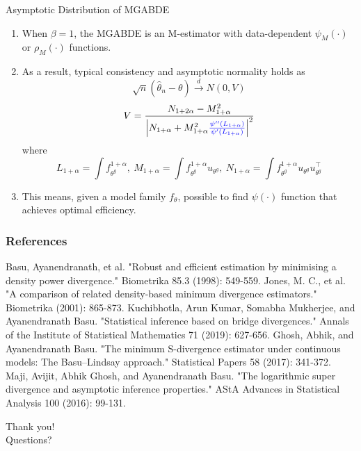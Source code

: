 \documentclass[10pt]{beamer}
\newcommand{\tr}{^{\intercal}}
\begin{document}
\begin{frame}{Asymptotic Distribution of MGABDE}
    \begin{enumerate}
        \item When $\beta = 1$, the MGABDE is an M-estimator with data-dependent $\psi_M(\cdot)$ or $\rho_M(\cdot)$ functions. 
        \item As a result, typical consistency and asymptotic normality holds as
        \begin{equation*}
            \sqrt{n}(\widehat{\theta}_n - \theta) \xrightarrow{d} N(0, V)
        \end{equation*}
        \begin{equation*}
            V = \frac{N_{1+2\alpha} - M_{1+\alpha}^2}{\left\vert N_{1+\alpha} + M_{1+\alpha}^2 \textcolor{blue}{\frac{\psi''(L_{1+\alpha})}{\psi'(L_{1+\alpha})}} \right\vert^2}            
        \end{equation*}
        \noindent where 
        \begin{equation*}
            L_{1+\alpha} = \int f_{\theta^g}^{1+\alpha}, \ M_{1+\alpha} = \int f_{\theta^g}^{1+\alpha}u_{\theta^g}, \ N_{1+\alpha} = \int f_{\theta^g}^{1+\alpha} u_{\theta^g}u_{\theta^g}\tr
        \end{equation*}
        \item This means, given a model family $f_\theta$, possible to find $\psi(\cdot)$ function that achieves optimal efficiency.
    \end{enumerate}

\end{frame}






\begin{frame}[shrink=20]
\frametitle{References}
    \begin{thebibliography}{9}
     Basu, Ayanendranath, et al. "Robust and efficient estimation by minimising a density power divergence." Biometrika 85.3 (1998): 549-559.
     Jones, M. C., et al. "A comparison of related density-based minimum divergence estimators." Biometrika (2001): 865-873.
     Kuchibhotla, Arun Kumar, Somabha Mukherjee, and Ayanendranath Basu. "Statistical inference based on bridge divergences." Annals of the Institute of Statistical Mathematics 71 (2019): 627-656.
     Ghosh, Abhik, and Ayanendranath Basu. "The minimum S-divergence estimator under continuous models: The Basu–Lindsay approach." Statistical Papers 58 (2017): 341-372.
     Maji, Avijit, Abhik Ghosh, and Ayanendranath Basu. "The logarithmic super divergence and asymptotic inference properties." AStA Advances in Statistical Analysis 100 (2016): 99-131.
    \end{thebibliography}
\end{frame}



{
\begin{frame}[standout]
  Thank you! \\
  Questions?
\end{frame}
}
\end{document}
